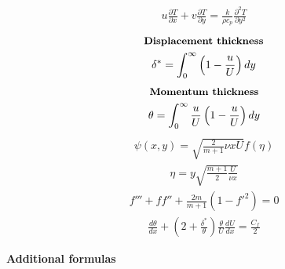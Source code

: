 \documentclass[10pt, a4paper]{article}
\begin{document}
\begin{multicols*}{2}
\begin{gather*}
        u\frac{\partial T}{\partial x} + v \frac{\partial T}{\partial y} =
        \frac{k}{\rho c_p} \frac{\partial^2 T}{\partial y^2}
    \end{gather*}
    \begin{gather*}
        \textbf{\small Displacement thickness} \\
        \delta^* = \int_0^\infty\left( 1 - \frac{u}{U} \right)dy
    \end{gather*}
    \begin{gather*}
        \textbf{\small Momentum thickness} \\
        \theta = \int_0^\infty \frac{u}{U}\left( 1 - \frac{u}{U} \right)dy
    \end{gather*}
    \begin{gather*}
        \psi(x,y) = \sqrt{\frac{2}{m+1}\nu x U}f(\eta)
    \end{gather*}
    \begin{gather*}
        \eta = y \sqrt{\frac{m+1}{2}\frac{U}{\nu x}}
    \end{gather*}
    \begin{gather*}
        f''' + ff'' + \frac{2m}{m+1}(1-f'^2)=0
    \end{gather*}
    \begin{gather*}
        \frac{d\theta}{dx} + \left( 2 + \frac{\delta^*}{\theta} \right)\frac{\theta}{U}\frac{dU}{dx} =
        \frac{C_f}{2}
    \end{gather*}
\end{multicols*}
\begin{center}
    \Large
    \textbf{Additional formulas}
    \vspace{0.5cm}
\end{center}
\end{document}
